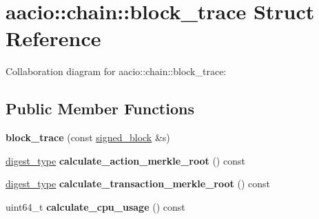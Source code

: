 \hypertarget{structaacio_1_1chain_1_1block__trace}{}\section{aacio\+:\+:chain\+:\+:block\+\_\+trace Struct Reference}
\label{structaacio_1_1chain_1_1block__trace}


Collaboration diagram for aacio\+:\+:chain\+:\+:block\+\_\+trace\+:
\subsection*{Public Member Functions}
\begin{DoxyCompactItemize}
\item 
\mbox{\label{structaacio_1_1chain_1_1block__trace_a2a11979c0a7287757d41c1b668073bb6}} 
{\bfseries block\+\_\+trace} (const \mbox{\hyperlink{structaacio_1_1chain_1_1signed__block}{signed\+\_\+block}} \&s)
\item 
\mbox{\label{structaacio_1_1chain_1_1block__trace_ab6e9b61acfd337dd7ecf448f50eb6937}} 
\mbox{\hyperlink{classfc_1_1sha256}{digest\+\_\+type}} {\bfseries calculate\+\_\+action\+\_\+merkle\+\_\+root} () const
\item 
\mbox{\label{structaacio_1_1chain_1_1block__trace_a07850cb8d38c9f88848d10d47c18a58b}} 
\mbox{\hyperlink{classfc_1_1sha256}{digest\+\_\+type}} {\bfseries calculate\+\_\+transaction\+\_\+merkle\+\_\+root} () const
\item 
\mbox{\label{structaacio_1_1chain_1_1block__trace_a46447c899495c277f8714f9c51a7c364}} 
uint64\+\_\+t {\bfseries calculate\+\_\+cpu\+\_\+usage} () const
\end{DoxyCompactItemize}
